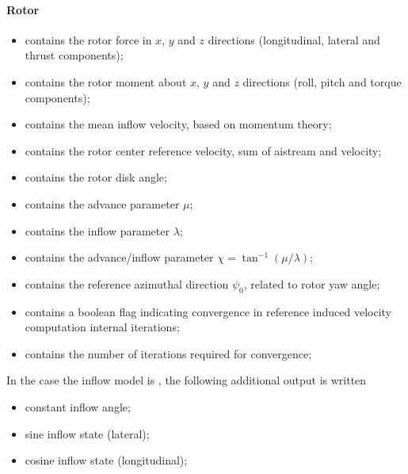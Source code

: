 \paragraph{Rotor}
\begin{itemize}
  \item {} contains the rotor force in $x$, $y$
    and $z$ directions (longitudinal, lateral and thrust components);
  \item {} contains the rotor moment 
    about $x$, $y$  and $z$ directions (roll, pitch and torque components);
  \item {} contains the mean inflow velocity,
    based on momentum theory;
  \item {} contains the rotor center reference
    velocity, sum of aistream and  velocity;
  \item {} contains the rotor disk angle;
  \item {} contains the advance parameter $\mu$;
  \item {} contains the inflow parameter
    $\lambda$;
  \item {} contains the advance/inflow 
    parameter $\chi = \tan^{-1}(\mu/\lambda)$;
  \item {} contains the reference azimuthal
    direction $\psi_0$, related to rotor yaw angle;
  \item {} contains a boolean flag
    indicating convergence in reference induced velocity computation internal iterations;
  \item {} contains the number of iterations
    required for convergence;
\end{itemize}
In the case the inflow model is , the following additional output is
written
\begin{itemize}
  \item {} constant inflow angle;
  \item {} sine inflow state (lateral);
  \item {} cosine inflow state (longitudinal);
\end{itemize}



